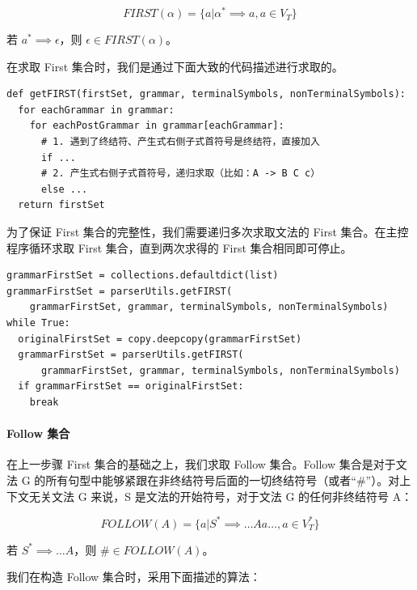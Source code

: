 \documentclass[UTF8]{ctexart}
\begin{document}
\begin{equation}
  FIRST(\alpha) = \{a | \alpha^* \implies a, a \in V_T\}
\end{equation}

若 $a^* \implies \epsilon$，则 $\epsilon \in FIRST(\alpha)$。

在求取 First 集合时，我们是通过下面大致的代码描述进行求取的。

\begin{verbatim}
def getFIRST(firstSet, grammar, terminalSymbols, nonTerminalSymbols):
  for eachGrammar in grammar:
    for eachPostGrammar in grammar[eachGrammar]:
      # 1. 遇到了终结符、产生式右侧子式首符号是终结符，直接加入
      if ...
      # 2. 产生式右侧子式首符号，递归求取（比如：A -> B C c）
      else ...
  return firstSet
\end{verbatim}

为了保证 First 集合的完整性，我们需要递归多次求取文法的 First 集合。在主控程序循环求取 First 集合，直到两次求得的 First 集合相同即可停止。

\begin{verbatim}
grammarFirstSet = collections.defaultdict(list)
grammarFirstSet = parserUtils.getFIRST(
    grammarFirstSet, grammar, terminalSymbols, nonTerminalSymbols)
while True:
  originalFirstSet = copy.deepcopy(grammarFirstSet)
  grammarFirstSet = parserUtils.getFIRST(
      grammarFirstSet, grammar, terminalSymbols, nonTerminalSymbols)
  if grammarFirstSet == originalFirstSet:
    break
\end{verbatim}

\paragraph{Follow 集合}
在上一步骤 First 集合的基础之上，我们求取 Follow 集合。Follow 集合是对于文法 G 的所有句型中能够紧跟在非终结符号后面的一切终结符号（或者“\#”）。对上下文无关文法 G 来说，S 是文法的开始符号，对于文法 G 的任何非终结符号 A：

\begin{equation}
  FOLLOW(A) = \{ a | S^* \implies \dots Aa \dots, a \in V_T^* \}
\end{equation}

若 $S^* \implies \dots A$，则 $\# \in FOLLOW(A)$。

我们在构造 Follow 集合时，采用下面描述的算法：

\noindent{}
\end{document}
